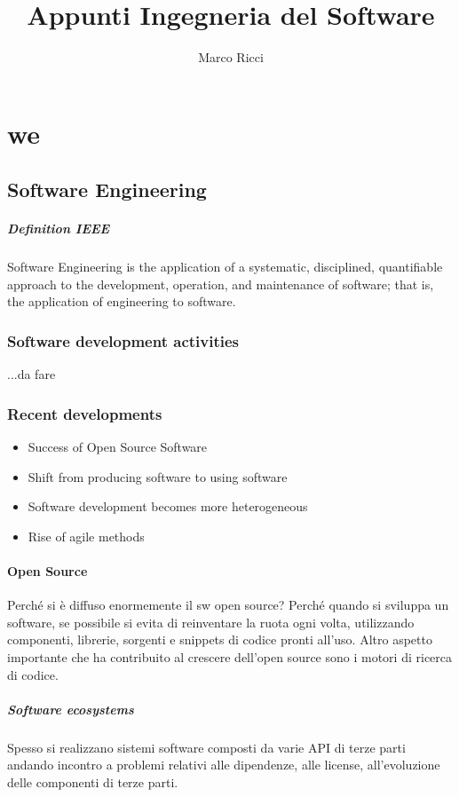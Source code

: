 \documentclass[10pt,a4paper]{book}
\author{Marco Ricci}
\title{Appunti Ingegneria del Software}
\begin{document}
\tableofcontents
\newpage
\chapter{we}
\section{Software Engineering}
\paragraph{Definition IEEE} Software Engineering is the application of a systematic, disciplined, quantifiable approach to the development, operation, and maintenance of software; that is, the application of engineering to software.

\subsection{Software development activities}
...da fare

\subsection{Recent developments}
\begin{itemize}
\item Success of Open Source Software
\item Shift from producing software to using software
\item Software development becomes more heterogeneous
\item Rise of agile methods
\end{itemize}

\subsubsection{Open Source}
Perché si è diffuso enormemente il sw open source? Perché quando si sviluppa un software, se possibile si evita di reinventare la ruota ogni volta, utilizzando componenti, librerie, sorgenti e snippets di codice pronti all'uso.
Altro aspetto importante che ha contribuito al crescere dell'open source sono i motori di ricerca di codice.

\paragraph{Software ecosystems} Spesso si realizzano sistemi software composti da varie API di terze parti andando incontro a problemi relativi alle dipendenze, alle license, all'evoluzione delle componenti di terze parti.
\end{document}
